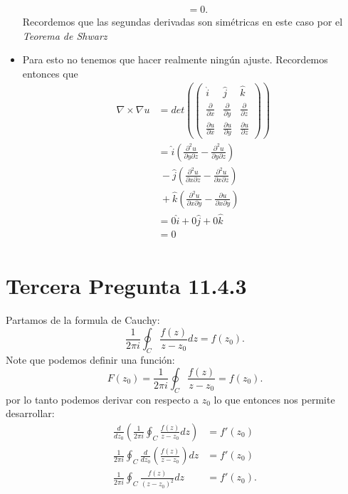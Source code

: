 \documentclass{report}
\begin{document}
\begin{itemize}
\begin{align*}
			  &= 0
.\end{align*} Recordemos que las segundas derivadas son simétricas en este caso por el \textit{Teorema de Shwarz}
  \item Para esto no tenemos que hacer realmente ningún ajuste. Recordemos entonces que 
    \begin{align*}
      \nabla \times \nabla u &= det \left(\begin{pmatrix} 
    \hat{i}& \hat{j} & \hat{k}\\
    \frac{\partial }{\partial x} & \frac{\partial }{\partial y} & \frac{\partial }{\partial z} \\
    \frac{\partial u}{\partial x} & \frac{\partial u}{\partial y} & \frac{\partial u}{\partial z} 
  \end{pmatrix} \right)\\
			     &= \hat{i}\left( \frac{\partial^2 u}{\partial y\partial z} - \frac{\partial^2 u}{\partial y\partial z}  \right) \\ 
			     &\ - \hat{j}\left( \frac{\partial^2 u}{\partial x\partial z} - \frac{\partial^2 u}{\partial x\partial z}  \right) \\ 
			     &\ + \hat{k}\left( \frac{\partial^2 u}{\partial x \partial y} - \frac{\partial u}{\partial x \partial y}  \right)   \\
  &= 0 \hat{i} + 0 \hat{j} + 0 \hat{k} \\
  &= 0 \\
\end{align*}
\end{itemize}

\chapter{Tercera Pregunta 11.4.3}
\label{chap:3}


Partamos de la formula de Cauchy: \[
\frac{1}{2\pi i}\oint_C \frac{f\left( z \right) }{z - z_0} dz = f\left( z_0 \right) 
.\] Note que podemos definir una función: \[
F\left( z_0 \right) = \frac{1}{2\pi i}\oint_C \frac{f\left( z \right) }{z - z_0} = f\left( z_0 \right) 
.\] por lo tanto podemos derivar con respecto a $z_0$ lo que entonces nos permite desarrollar:
\begin{align*}
  \frac{d}{dz_0}\left( \frac{1}{2\pi i}\oint_C \frac{f\left( z \right) }{z - z_0}dz\right) &= f'\left( z_0 \right)\\
  \frac{1}{2\pi i}\oint_C \frac{d}{dz_0}\left( \frac{f\left( z \right) }{z - z_0} \right) dz &= f'\left( z_0 \right)  \\
  \frac{1}{2\pi i}\oint_C \frac{f\left( z \right) }{\left( z - z_0 \right)^{2} }dz &= f'\left( z_0 \right)
.\end{align*}
\end{document}
